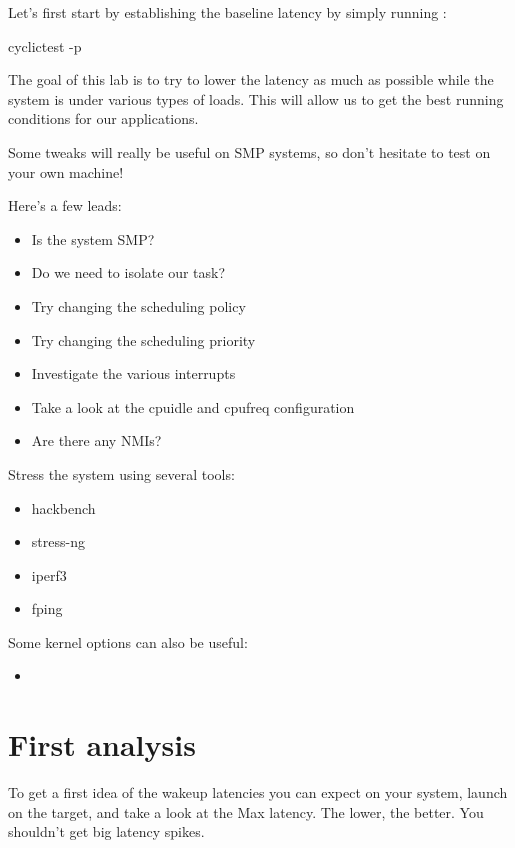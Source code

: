 Let's first start by establishing the baseline latency by simply running :

\begin{bashinput}
cyclictest -p 
\end{bashinput}

The goal of this lab is to try to lower the latency as much as possible while
the system is under various types of loads. This will allow us to get the
best running conditions for our applications.

Some tweaks will really be useful on SMP systems, so don't hesitate to test on
your own machine!

Here's a few leads:

\begin{itemize}
        \item Is the system SMP?
        \item Do we need to isolate our task?
        \item Try changing the scheduling policy
        \item Try changing the scheduling priority
        \item Investigate the various interrupts
        \item Take a look at the cpuidle and cpufreq configuration
        \item Are there any NMIs?
\end{itemize}

Stress the system using several tools:

\begin{itemize}
        \item hackbench
        \item stress-ng
        \item iperf3
        \item fping
\end{itemize}

Some kernel options can also be useful:

\begin{itemize}
        \item {}
\end{itemize}

\section{First analysis}

To get a first idea of the wakeup latencies you can expect on your system, launch
 on the target, and take a look at the Max latency. The lower, the
better. You shouldn't get big latency spikes.

